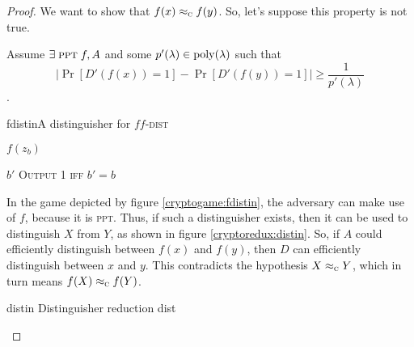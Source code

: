 \begin{proof}
    We want to show that $f(x) \approx_\textsc{c} f(y)$. So, let's suppose this property is not true.

    Assume $\exists\; \textsc{ppt}\; f, A$ and some $p'(\lambda) \in \mathrm{poly}(\lambda) $ such that
    \begin{equation}
        \left| \Pr[D'(f(x)) = 1] - \Pr[D'(f(y)) = 1] \right| \geq \frac{1}{p'(\lambda)}
    \end{equation}.

    \begin{cryptogame}{fdistin}{A distinguisher for $f$}{$f$-\textsc{dist}}

        {$f(z_b)$}
        {}

        \cseqdelay

        \send{}
        {$b'$}
        {\textsc{Output 1 iff} $b' = b$}

    \end{cryptogame}
    
    In the game depicted by figure \ref{cryptogame:fdistin}, the adversary can make use of $f$, because it is \textsc{ppt}. Thus, if such a distinguisher exists, then it can be used to distinguish $X$ from $Y$, as shown in figure \ref{cryptoredux:distin}. So, if $A$ could efficiently distinguish between $f(x)$ and $f(y)$, then $D$ can efficiently distinguish between $x$ and $y$. This contradicts the hypothesis $X \approx_\textsc{c} Y$, which in turn means $f(X) \approx_\textsc{c} f(Y)$.

    \begin{cryptoredux}
        {distin}
        {Distinguisher reduction}
        {dist}
        {}
        
      
        

        
    \end{cryptoredux}

\end{proof}

